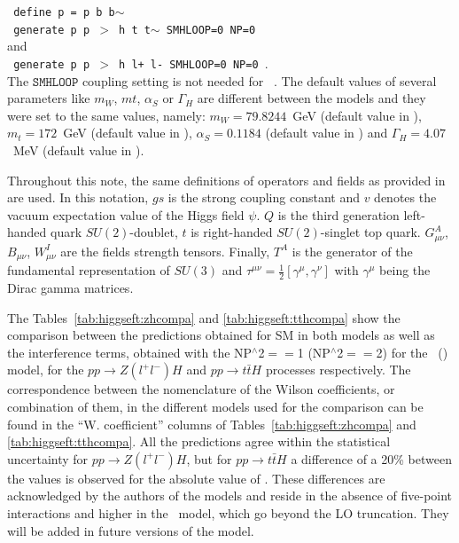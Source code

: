 \noindent
  \texttt{ define p = p b b$\sim$ }\\
  \texttt{ generate p p $>$ h t t$\sim$ SMHLOOP=0 NP=0 }\\
and \\ 
  \texttt{ generate p p $>$ h l+ l- SMHLOOP=0  NP=0     }.\\

  The $\texttt{SMHLOOP}$ coupling setting is not needed for \SMEFTatNLO\ . The default values of several parameters like $m_W$, $mt$, $\alpha_S$ or $\Gamma_{H}$ are different between the models and they were set to the same values, namely:
  $m_W = 79.8244$~GeV (default value in \SMEFTatNLO), 
  $m_t = 172$~GeV (default value in \SMEFTatNLO),
  $\alpha_S = 0.1184$ (default value in \SMEFTatNLO) and 
  $\Gamma_{H} = 4.07$~MeV (default value in \SMEFTsim). 

  Throughout this note, the same definitions of operators and fields as provided in~\cite{SMEFTNLOdefs} are used. In this notation, $gs$ is the strong coupling constant and $v$ denotes the vacuum expectation value of the Higgs field $\psi$. $Q$ is the third generation left-handed quark $SU(2)$-doublet, $t$ is right-handed $SU(2)$-singlet top quark. $G_{\mu\nu}^{A}$, $B_{\mu\nu}$, $W^{I}_{\mu\nu}$ are the fields strength tensors. Finally, $T^{A}$ is the generator of the fundamental representation of $SU(3)$ and $\tau^{\mu\nu}=\frac{1}{2}[\gamma^{\mu},\gamma^{\nu}]$  with $\gamma^{\mu}$ being the Dirac gamma matrices.

  The Tables~\ref{tab:higgseft:zhcompa} and \ref{tab:higgseft:tthcompa} show the comparison between the predictions obtained for SM in both models as well as the interference terms, obtained with the NP$^{\wedge}$2$==$1 (NP$^{\wedge}$2$==$2)  for the \SMEFTsim\ (\SMEFTatNLO) model, for the $pp\to Z(l^{+}l^{-})H$  and $pp\to t\bar{t}H$ processes respectively. The correspondence between the nomenclature of the Wilson coefficients, or combination of them, in the different models used for the comparison can be found in the ``W. coefficient'' columns of Tables~\ref{tab:higgseft:zhcompa} and \ref{tab:higgseft:tthcompa}. All the predictions agree within the statistical uncertainty for $pp\to Z(l^{+}l^{-})H$, but for  $pp\to t\bar{t}H$ a difference of a 20\% between the values is observed for the absolute value of \ctG. These differences are acknowledged by the authors of the models and reside in the absence of five-point interactions and higher in the \SMEFTsim\ model, which go beyond the LO truncation. They will be added in future versions of the model.

